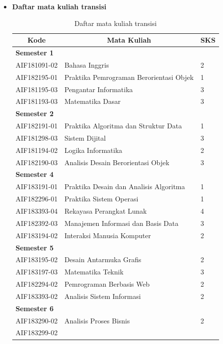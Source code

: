 \documentclass[a4paper,twoside]{article}
\begin{document}
\begin{enumerate}
\begin{enumerate}
\begin{itemize}
					\item \textbf{Daftar mata kuliah transisi}\\
					\begin{table}[H]
						\centering
							\caption{Daftar mata kuliah transisi}
							\begin{tabular}{|p{2.85cm}|p{7.95cm}|p{1.75cm}|}
								\hline
								\multicolumn{1}{|c|}{\textbf{Kode}} & \multicolumn{1}{c|}{\textbf{Mata Kuliah}} & \multicolumn{1}{c|}{\textbf{SKS}} \\ \hline
								\multicolumn{3}{|l|}{\textbf{Semester 1}}                    \\ \hline
					AIF181091-02 & Bahasa Inggris                          & 2   \\ \hline
					AIF182195-01 & Praktika Pemrograman Berorientasi Objek & 1   \\ \hline
					AIF181195-03 & Pengantar Informatika                   & 3   \\ \hline
					AIF181193-03 & Matematika Dasar                        & 3   \\ \hline
					\multicolumn{3}{|l|}{\textbf{Semester 2}}                    \\ \hline
					AIF182191-01 & Praktika Algoritma dan Struktur Data    & 1   \\ \hline
					AIF181298-03 & Sistem Dijital                          & 3   \\ \hline
					AIF181194-02 & Logika Informatika                      & 2   \\ \hline
					AIF182190-03 & Analisis Desain Berorientasi  Objek     & 3   \\ \hline
					\multicolumn{3}{|l|}{\textbf{Semester 4}}                    \\ \hline
					AIF183191-01 & Praktika Desain dan Analisis Algoritma  & 1   \\ \hline
					AIF182296-01 & Praktika Sistem Operasi                 & 1   \\ \hline
					AIF183393-04 & Rekayasa Perangkat Lunak                & 4   \\ \hline
					AIF182392-03 & Manajemen Informasi dan Basis Data      & 3   \\ \hline
					AIF183194-02 & Interaksi Manusia Komputer              & 2   \\ \hline
					\multicolumn{3}{|l|}{\textbf{Semester 5}}                    \\ \hline
					AIF183195-02 & Desain Antarmuka Grafis                 & 2   \\ \hline
					AIF183197-03 & Matematika Teknik                       & 3   \\ \hline
					AIF182294-02 & Pemrograman Berbasis Web                & 2   \\ \hline
					AIF183393-02 & Analisis Sistem Informasi               & 2   \\ \hline
					\multicolumn{3}{|l|}{\textbf{Semester 6}}                    \\ \hline
					AIF183290-02 & Analisis Proses Bisnis                  & 2   \\ \hline
					AIF183299-02


\end{tabular}
\end{table}
\end{itemize}
\end{enumerate}
\end{enumerate}
\end{document}
